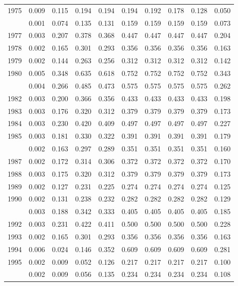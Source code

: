 \documentclass[
]{article}
\begin{document}
\begin{longtable}[t]{lrrrrrrrrr}
1975 & 0.009 & 0.115 & 0.194 & 0.194 & 0.194 & 0.192 & 0.178 & 0.128 & 0.050\\
\addlinespace
1976 & 0.001 & 0.074 & 0.135 & 0.131 & 0.159 & 0.159 & 0.159 & 0.159 & 0.073\\
1977 & 0.003 & 0.207 & 0.378 & 0.368 & 0.447 & 0.447 & 0.447 & 0.447 & 0.204\\
1978 & 0.002 & 0.165 & 0.301 & 0.293 & 0.356 & 0.356 & 0.356 & 0.356 & 0.163\\
1979 & 0.002 & 0.144 & 0.263 & 0.256 & 0.312 & 0.312 & 0.312 & 0.312 & 0.142\\
1980 & 0.005 & 0.348 & 0.635 & 0.618 & 0.752 & 0.752 & 0.752 & 0.752 & 0.343\\
\addlinespace
1981 & 0.004 & 0.266 & 0.485 & 0.473 & 0.575 & 0.575 & 0.575 & 0.575 & 0.262\\
1982 & 0.003 & 0.200 & 0.366 & 0.356 & 0.433 & 0.433 & 0.433 & 0.433 & 0.198\\
1983 & 0.003 & 0.176 & 0.320 & 0.312 & 0.379 & 0.379 & 0.379 & 0.379 & 0.173\\
1984 & 0.003 & 0.230 & 0.420 & 0.409 & 0.497 & 0.497 & 0.497 & 0.497 & 0.227\\
1985 & 0.003 & 0.181 & 0.330 & 0.322 & 0.391 & 0.391 & 0.391 & 0.391 & 0.179\\
\addlinespace
1986 & 0.002 & 0.163 & 0.297 & 0.289 & 0.351 & 0.351 & 0.351 & 0.351 & 0.160\\
1987 & 0.002 & 0.172 & 0.314 & 0.306 & 0.372 & 0.372 & 0.372 & 0.372 & 0.170\\
1988 & 0.003 & 0.175 & 0.320 & 0.312 & 0.379 & 0.379 & 0.379 & 0.379 & 0.173\\
1989 & 0.002 & 0.127 & 0.231 & 0.225 & 0.274 & 0.274 & 0.274 & 0.274 & 0.125\\
1990 & 0.002 & 0.131 & 0.238 & 0.232 & 0.282 & 0.282 & 0.282 & 0.282 & 0.129\\
\addlinespace
1991 & 0.003 & 0.188 & 0.342 & 0.333 & 0.405 & 0.405 & 0.405 & 0.405 & 0.185\\
1992 & 0.003 & 0.231 & 0.422 & 0.411 & 0.500 & 0.500 & 0.500 & 0.500 & 0.228\\
1993 & 0.002 & 0.165 & 0.301 & 0.293 & 0.356 & 0.356 & 0.356 & 0.356 & 0.163\\
1994 & 0.006 & 0.024 & 0.146 & 0.352 & 0.609 & 0.609 & 0.609 & 0.609 & 0.281\\
1995 & 0.002 & 0.009 & 0.052 & 0.126 & 0.217 & 0.217 & 0.217 & 0.217 & 0.100\\
\addlinespace
1996 & 0.002 & 0.009 & 0.056 & 0.135 & 0.234 & 0.234 & 0.234 & 0.234 & 0.108\\

\end{longtable}
\end{document}

